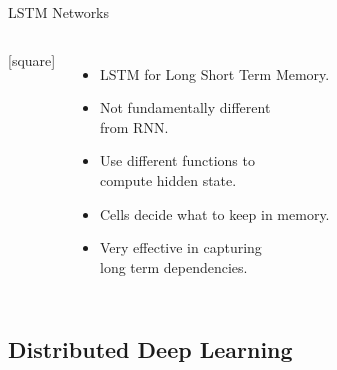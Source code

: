 \begin{frame}{LSTM Networks}
    \begin{columns}
        [square]
        \begin{itemize}
            \item{LSTM for Long Short Term Memory.}
            \vspace{0.2cm}
            \item{Not fundamentally different\\from RNN.}
            \vspace{0.2cm}
            \item{Use different functions to\\compute hidden state.}
            \vspace{0.2cm}
            \item{Cells decide what to keep in memory.}
            \vspace{0.2cm}
            \item{Very effective in capturing\\long term dependencies.}
        \end{itemize}
        \begin{figure}
            \label{fig:rnn-vs-lstm}
        \end{figure}
    \end{columns}
\end{frame}

\subsection{Distributed Deep Learning}\label{subsec:distributed-deep-learning}

